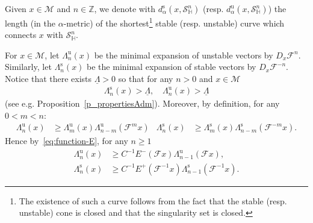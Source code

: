 \documentclass[AHL, Unicode, longabstracts,published]{cedram}
\newcommand{\inv}{^{-1}}
\newcommand{\unstable}{\text{u}}
\newcommand{\stable}{\text{s}}
\newcommand{\bZ}{\mathbb{Z}}
\newcommand{\homo}{\mathbb{H}}
\newcommand{\cm}{\mathcal{F}}
\newcommand{\csp}{\mathcal{M}}
\newcommand{\dadmPrivate}{d\adm}
\newcommand{\ds}{\dadmPrivate^{\stable}}
\newcommand{\du}{\dadmPrivate^{\unstable}}
\newcommand{\singPrivate}{\mathcal{S}}
\newcommand{\hsing}[1]{{\singPrivate}_\homo^{#1}}
\newcommand{\adm}{_{\alpha^{+}}}
\newcommand{\admName}{\alpha^{+}}
\renewcommand{\admName}{\alpha}
\renewcommand{\adm}{_{\alpha}}
\begin{document}
Given $x\in\csp$ and $n\in\bZ$, we denote with $\ds(x,\hsing n)$ (resp. $\du(x,\hsing n)$) the length (in the $\admName$-metric) of the shortest\footnote{The existence of such a curve follows from the fact that the stable (resp. unstable) cone is closed and that the singularity set is closed.} stable (resp. unstable) curve which connects $x$ with $\hsing n$.

For $x\in\csp$, let $\Lambda^{\unstable}_{n}(x)$ be the minimal expansion of unstable vectors by $D_{x}\cm^{n}$. Similarly, let $\Lambda^{\stable}_{n}(x)$ be the minimal expansion of stable vectors by $D_{x}\cm^{-n}$. Notice that there exists $\underline\Lambda > 0$ so that for any $n > 0$ and $x\in\csp$
\begin{align}\label{eq:lambda-lowerbar}
\Lambda_{n}^{\stable}(x) > \underline\Lambda, \quad
\Lambda_{n}^{\unstable}(x) > \underline\Lambda
\end{align}
(see e.g. Proposition~\ref{p_propertiesAdm}). Moreover, by definition, for any $0 < m < n$:
\begin{align*}
\Lambda^{\unstable}_{n}(x)&\ge\Lambda^{\unstable}_{m}(x)\Lambda^{\unstable}_{n-m}(\cm^{m}x)&
\Lambda^{\stable}_{n}(x)&\ge\Lambda^{\stable}_{m}(x)\Lambda^{\stable}_{n-m}(\cm^{-m}x).
\end{align*}
Hence by~\eqref{eq:function-E}, for any $n\ge 1$
\begin{subequations}
\begin{align}\label{eq:lambda-E}
\Lambda^{\unstable}_{n}(x)&\ge C^{-1} E^{-}(\cm x)\Lambda^{\unstable}_{n-1}(\cm x),\\\label{eq:lambda-EE}
\Lambda^{\stable}_{n}(x)&\ge C^{-1} E^{+}(\cm\inv x)\Lambda^{\stable}_{n-1}(\cm\inv x).
\end{align}
\end{subequations}
\end{document}
